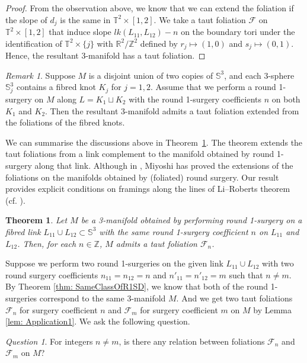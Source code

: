 \documentclass{amsart}
\theoremstyle{plain}
\newtheorem{thm}{Theorem}
\theoremstyle{remark}
\newtheorem{rem}{Remark}
\newtheorem{ques}{Question}
\theoremstyle{definition}
\newcommand{\R}{\mathbb{R}}
\newcommand{\s}{\mathbb{S}}
\begin{document}
\begin{proof}
From the observation above, we know that we can extend the foliation if the slope of $d_j$ is the same in $\mathbb{T}^2 \times [1,2]$. 
We take a taut foliation $\mathcal{F}$ on $\mathbb{T}^2 \times [1,2]$ that induce slope $lk(L_{11}, L_{12})-n $ on the boundary tori under the identification of $\mathbb{T}^2\times \{j\}$ with $\R^2/ \mathbb{Z}^2$ defined by $r_j \mapsto (1,0)$ and $s_j \mapsto (0,1)$.
Hence, the resultant 3-manifold has a taut foliation. 
\end{proof}


\begin{rem}\label{lem: Application2}
    Suppose $M$ is a disjoint union of two copies of $\s^3$, and each 3-sphere  $\s^3_j$ contains a fibred knot $K_j$ for $j=1, 2$. 
    Assume that we perform a round 1-surgery on $M$ along $L=K_1 \sqcup K_2$ with the round 1-surgery coefficients $n$ on both $K_1$ and $K_2$.
    Then the resultant 3-manifold admits a taut foliation extended from the foliations of the fibred knots.
\end{rem}

We can summarise the discussions above in Theorem~\ref{Thm: InftyTautFoln}. The theorem extends the taut foliations from a link complement to the manifold obtained by round 1-surgery along that link. %
Although in \cite{Miyoshi}, Miyoshi has proved the extensions of the foliations on the manifolds obtained by (foliated) round surgery. Our result provides explicit conditions on framings along the lines of Li--Roberts theorem (cf. \cite{Li2014}). 

\begin{thm}\label{Thm: InftyTautFoln}
    Let $M$ be a 3-manifold obtained by performing round 1-surgery on a fibred link $L_{11}\cup L_{12} \subset \s^3$ with the same round 1-surgery coefficient $n$ on $L_{11}$ and $L_{12}$. 
    Then, for each $n\in \mathbb{Z}$, $M$ admits a taut foliation $\mathcal{F}_n$.     
\end{thm}

Suppose we perform two round 1-surgeries on the given link $L_{11} \cup L_{12}$ with two round surgery coefficients $n_{11}=n_{12}=n$ and $n'_{11}=n'_{12}=m$ such that $n \neq m$.
By Theorem \ref{thm: SameClassOfR1SD}, we know that both of the round 1-surgeries correspond to the same 3-manifold $M$. And we get two taut foliations $\mathcal{F}_n$ for surgery coefficient $n$ and $\mathcal{F}_m$ for surgery coefficient $m$ on $M$ by Lemma \ref{lem: Application1}. 
We ask the following question. 
\begin{ques}\label{Qn: distinct_fol}
    For integers $n\neq m$, is there any relation between foliations $\mathcal{F}_n$ and $\mathcal{F}_m$ on $M$?
\end{ques}
\end{document}
